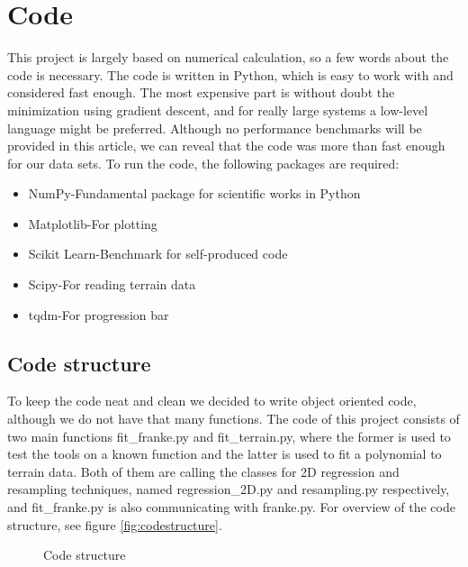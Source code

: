 \section{Code} \label{sec:code}
This project is largely based on numerical calculation, so a few words about the code is necessary. The code is written in Python, which is easy to work with and considered fast enough. The most expensive part is without doubt the minimization using gradient descent, and for really large systems a low-level language might be preferred. Although no performance benchmarks will be provided in this article, we can reveal that the code was more than fast enough for our data sets. To run the code, the following packages are required:
\begin{itemize}
\item NumPy\quad-\quad Fundamental package for scientific works in Python
\item Matplotlib\quad-\quad For plotting
\item Scikit Learn\quad-\quad Benchmark for self-produced code
\item Scipy\quad-\quad For reading terrain data
\item tqdm\quad-\quad For progression bar
\end{itemize}

\subsection{Code structure} \label{sec:structure}
To keep the code neat and clean we decided to write object oriented code, although we do not have that many functions. The code of this project consists of two main functions fit\_franke.py and fit\_terrain.py, where the former is used to test the tools on a known function and the latter is used to fit a polynomial to terrain data. Both of them are calling the classes for 2D regression and resampling techniques, named regression\_2D.py and resampling.py respectively, and fit\_franke.py is also communicating with franke.py. For overview of the code structure, see figure \eqref{fig:codestructure}.
\begin{figure}
\centering
{}
\caption{Code structure}
\label{fig:codestructure}
\end{figure}

